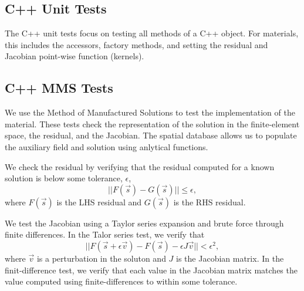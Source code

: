 \subsection{C++ Unit Tests}

The C++ unit tests focus on testing all methods of a C++ object. For
materials, this includes the accessors, factory methods, and setting
the residual and Jacobian point-wise function (kernels).

\subsection{C++ MMS Tests}

We use the Method of Manufactured Solutions to test the implementation
of the material. These tests check the representation of the solution
in the finite-element space, the residual, and the Jacobian. The
 spatial database allows us to populate the
auxiliary field and solution using anlytical functions.

We check the residual by verifying that the residual computed for a
known solution is below some tolerance, $\epsilon$,
\begin{equation}
  || F(\vec{s}) - G(\vec{s}) || \le \epsilon,
\end{equation}
where $F(\vec{s})$ is the LHS residual and $G(\vec{s})$ is the RHS
residual.

We test the Jacobian using a Taylor series expansion and brute force
through finite differences. In the Talor series test, we verify that
\begin{equation}
  || F(\vec{s} + \epsilon \vec{v}) - F(\vec{s}) - \epsilon J \vec{v} || < \epsilon^2,
\end{equation}
where $\vec{v}$ is a perturbation in the soluton and $J$ is the
Jacobian matrix.  In the finit-difference test, we verify that each
value in the Jacobian matrix matches the value computed using
finite-differences to within some tolerance.


